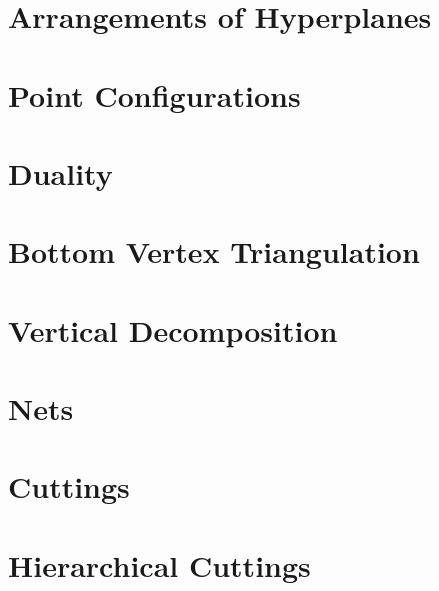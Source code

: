 \section{Arrangements of Hyperplanes}

\section{Point Configurations}

\section{Duality}

\section{Bottom Vertex Triangulation}

\section{Vertical Decomposition}

\section{Nets}

\section{Cuttings}

\section{Hierarchical Cuttings}
